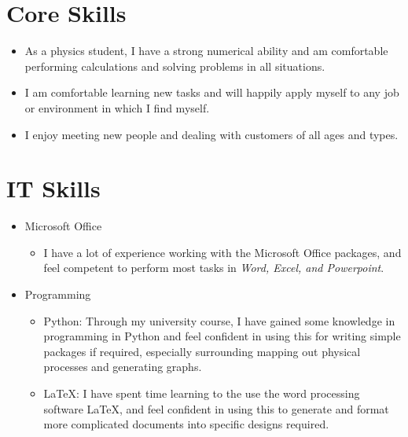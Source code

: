 \documentclass[10pt, a4paper]{article}
\begin{document}
\section{Core Skills}
\begin{itemize}
	\item As a physics student, I have a strong numerical ability and am comfortable performing calculations and solving problems in all situations.
	\item I am comfortable learning new tasks and will happily apply myself to any job or environment in which I find myself.
	\item I enjoy meeting new people and dealing with customers of all ages and types.
\end{itemize}

\section{IT Skills}
\begin{itemize}
	\item Microsoft Office
	\begin{itemize}
		\item I have a lot of experience working with the Microsoft Office packages, and feel competent to perform most tasks in \textit{Word, Excel, and Powerpoint}.
	\end{itemize}
	\item Programming
	\begin{itemize}
		\item Python: Through my university course, I have gained some knowledge in programming in Python and feel confident in using this for writing simple packages if required, especially surrounding mapping out physical processes and generating graphs.
		\item \LaTeX: I have spent time learning to the use the word processing software \LaTeX, and feel confident in using this to generate and format more complicated documents into specific designs required.
	\end{itemize}
\end{itemize}

\newpage
\end{document}
